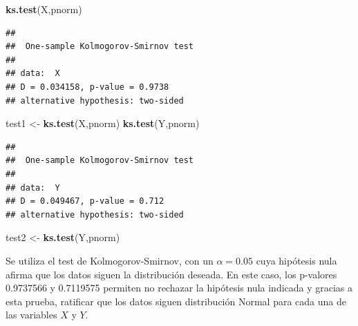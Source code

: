 \documentclass[]{article}
\newenvironment{Shaded}{\begin{snugshade}}{\end{snugshade}}
\newcommand{\KeywordTok}[1]{\textcolor[rgb]{0.13,0.29,0.53}{\textbf{#1}}}
\newcommand{\StringTok}[1]{\textcolor[rgb]{0.31,0.60,0.02}{#1}}
\newcommand{\NormalTok}[1]{#1}
\begin{document}
\begin{Shaded}
\begin{Highlighting}[]
\KeywordTok{ks.test}\NormalTok{(X,pnorm) }
\end{Highlighting}
\end{Shaded}

\begin{verbatim}
## 
##  One-sample Kolmogorov-Smirnov test
## 
## data:  X
## D = 0.034158, p-value = 0.9738
## alternative hypothesis: two-sided
\end{verbatim}

\begin{Shaded}
\begin{Highlighting}[]
\NormalTok{test1 <-}\StringTok{ }\KeywordTok{ks.test}\NormalTok{(X,pnorm)}
\KeywordTok{ks.test}\NormalTok{(Y,pnorm)}
\end{Highlighting}
\end{Shaded}

\begin{verbatim}
## 
##  One-sample Kolmogorov-Smirnov test
## 
## data:  Y
## D = 0.049467, p-value = 0.712
## alternative hypothesis: two-sided
\end{verbatim}

\begin{Shaded}
\begin{Highlighting}[]
\NormalTok{test2 <-}\StringTok{ }\KeywordTok{ks.test}\NormalTok{(Y,pnorm)}
\end{Highlighting}
\end{Shaded}

Se utiliza el test de Kolmogorov-Smirnov, con un \(\alpha=0.05\) cuya
hipótesis nula afirma que los datos siguen la distribución deseada. En
este caso, los p-valores 0.9737566 y 0.7119575 permiten no rechazar la
hipótesis nula indicada y gracias a esta prueba, ratificar que los datos
siguen distribución Normal para cada una de las variables \(X\) y \(Y\).
\end{document}
